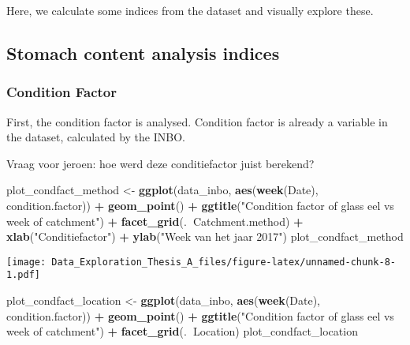 \documentclass[]{article}
\newenvironment{Shaded}{\begin{snugshade}}{\end{snugshade}}
\newcommand{\KeywordTok}[1]{\textcolor[rgb]{0.13,0.29,0.53}{\textbf{#1}}}
\newcommand{\StringTok}[1]{\textcolor[rgb]{0.31,0.60,0.02}{#1}}
\newcommand{\OperatorTok}[1]{\textcolor[rgb]{0.81,0.36,0.00}{\textbf{#1}}}
\newcommand{\NormalTok}[1]{#1}
\begin{document}
Here, we calculate some indices from the dataset and visually explore
these.

\subsection{Stomach content analysis
indices}\label{stomach-content-analysis-indices}

\subsubsection{Condition Factor}\label{condition-factor}

First, the condition factor is analysed. Condition factor is already a
variable in the dataset, calculated by the INBO.

Vraag voor jeroen: hoe werd deze conditiefactor juist berekend?

\begin{Shaded}
\begin{Highlighting}[]
\NormalTok{plot_condfact_method <-}\StringTok{ }\KeywordTok{ggplot}\NormalTok{(data_inbo, }\KeywordTok{aes}\NormalTok{(}\KeywordTok{week}\NormalTok{(Date), condition.factor)) }\OperatorTok{+}
\StringTok{  }\KeywordTok{geom_point}\NormalTok{() }\OperatorTok{+}
\StringTok{  }\KeywordTok{ggtitle}\NormalTok{(}\StringTok{"Condition factor of glass eel vs week of catchment"}\NormalTok{) }\OperatorTok{+}
\StringTok{  }\KeywordTok{facet_grid}\NormalTok{(.}\OperatorTok{~}\NormalTok{Catchment.method) }\OperatorTok{+}
\StringTok{  }\KeywordTok{xlab}\NormalTok{(}\StringTok{"Conditiefactor"}\NormalTok{) }\OperatorTok{+}
\StringTok{  }\KeywordTok{ylab}\NormalTok{(}\StringTok{"Week van het jaar 2017"}\NormalTok{)}
\NormalTok{plot_condfact_method}
\end{Highlighting}
\end{Shaded}

\texttt{[image: Data\_Exploration\_Thesis\_A\_files/figure-latex/unnamed-chunk-8-1.pdf]}

\begin{Shaded}
\begin{Highlighting}[]
\NormalTok{plot_condfact_location <-}\StringTok{ }\KeywordTok{ggplot}\NormalTok{(data_inbo, }\KeywordTok{aes}\NormalTok{(}\KeywordTok{week}\NormalTok{(Date), condition.factor)) }\OperatorTok{+}
\StringTok{  }\KeywordTok{geom_point}\NormalTok{() }\OperatorTok{+}
\StringTok{  }\KeywordTok{ggtitle}\NormalTok{(}\StringTok{"Condition factor of glass eel vs week of catchment"}\NormalTok{) }\OperatorTok{+}
\StringTok{  }\KeywordTok{facet_grid}\NormalTok{(.}\OperatorTok{~}\NormalTok{Location)}
\NormalTok{plot_condfact_location}
\end{Highlighting}
\end{Shaded}
\end{document}
